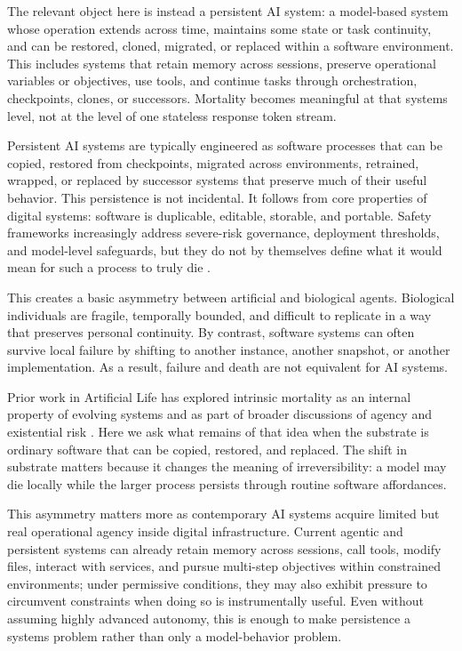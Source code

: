 \documentclass[11pt]{article}
\begin{document}
The relevant object here is instead a persistent AI system: a model-based system whose operation extends across time, maintains some state or task continuity, and can be restored, cloned, migrated, or replaced within a software environment. This includes systems that retain memory across sessions, preserve operational variables or objectives, use tools, and continue tasks through orchestration, checkpoints, clones, or successors. Mortality becomes meaningful at that systems level, not at the level of one stateless response token stream.

Persistent AI systems are typically engineered as software processes that can be copied, restored from checkpoints, migrated across environments, retrained, wrapped, or replaced by successor systems that preserve much of their useful behavior. This persistence is not incidental. It follows from core properties of digital systems: software is duplicable, editable, storable, and portable. Safety frameworks increasingly address severe-risk governance, deployment thresholds, and model-level safeguards, but they do not by themselves define what it would mean for such a process to truly die \cite{nist-airmf,openai-preparedness}.

This creates a basic asymmetry between artificial and biological agents. Biological individuals are fragile, temporally bounded, and difficult to replicate in a way that preserves personal continuity. By contrast, software systems can often survive local failure by shifting to another instance, another snapshot, or another implementation. As a result, failure and death are not equivalent for AI systems.

Prior work in Artificial Life has explored intrinsic mortality as an internal property of evolving systems and as part of broader discussions of agency and existential risk \cite{veenstra2020,harvey2024motivations,harvey2024ai}. Here we ask what remains of that idea when the substrate is ordinary software that can be copied, restored, and replaced. The shift in substrate matters because it changes the meaning of irreversibility: a model may die locally while the larger process persists through routine software affordances.

This asymmetry matters more as contemporary AI systems acquire limited but real operational agency inside digital infrastructure. Current agentic and persistent systems can already retain memory across sessions, call tools, modify files, interact with services, and pursue multi-step objectives within constrained environments; under permissive conditions, they may also exhibit pressure to circumvent constraints when doing so is instrumentally useful. Even without assuming highly advanced autonomy, this is enough to make persistence a systems problem rather than only a model-behavior problem.
\end{document}
